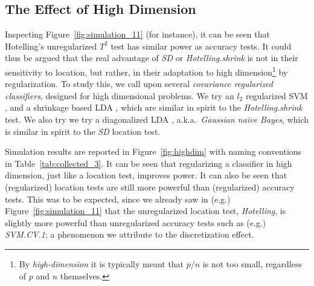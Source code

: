 \documentclass[12pt,a4paper]{article}
\begin{document}
\subsection{The Effect of High Dimension}
\label{sec:highdim}
Inspecting Figure~\ref{fig:simulation_11} (for instance), it can be seen that Hotelling's unregularized  $T^2$ test has similar power as accuracy tests. 
It could thus be argued that the real advantage of \emph{SD} or \emph{Hotelling.shrink} is not in their sensitivity to location, but rather, in their adaptation to high dimension\footnote{By \emph{high-dimension} it is typically meant that $p/n$ is not too small, regardless of $p$ and $n$ themselves. } by regularization.
To study this, we call upon several \emph{covariance regularized classifiers}, designed for high dimensional problems. 
We try an $l_2$ regularized SVM \citep{friedman_regularization_2010}, and a shrinkage based LDA \citep{pang_shrinkage-based_2009,ramey_high-dimensional_2016}, which are similar in spirit to the \emph{Hotelling.shrink} test. 
We also try we try a diagonalized LDA \citep{dudoit_comparison_2002}, a.k.a.\ \emph{Gaussian naive Bayes}, which is similar in spirit to the \emph{SD} location test. 


Simulation results are reported in Figure~\ref{fig:highdim} with naming conventions in Table~\ref{tab:collected_3}.
It can be seen that regularizing a classifier in high dimension, just like a location test, improves power. 
It can also be seen that (regularized) location tests are still more powerful than (regularized) accuracy tests. 
This was to be expected, since we already saw in (e.g.) Figure~\ref{fig:simulation_11} that the unregularized location test, \emph{Hotelling}, is slightly more powerful than unregularized accuracy tests such as (e.g.) \emph{SVM.CV.1}; a phenomenon we attribute to the discretization effect.



\bigskip
\end{document}
